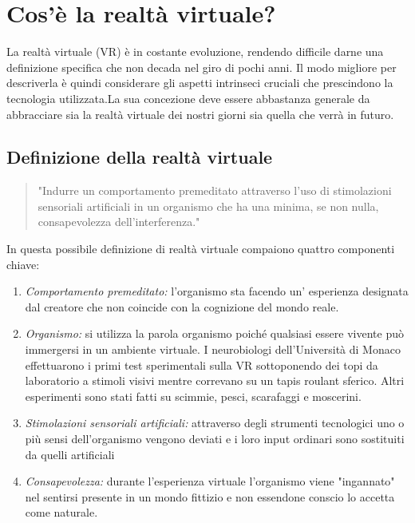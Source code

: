 \section{Cos'è la realtà virtuale?}

La realtà virtuale (VR) è in costante evoluzione, rendendo difficile darne una definizione specifica che non decada nel giro di pochi anni. Il modo migliore per descriverla è quindi considerare gli aspetti intrinseci cruciali che prescindono la tecnologia utilizzata.La sua concezione deve essere abbastanza generale da abbracciare sia la realtà virtuale dei nostri giorni sia quella che verrà in futuro.
\subsection{Definizione della realtà virtuale}

\begin{quotation}"Indurre un comportamento premeditato attraverso l'uso di stimolazioni sensoriali artificiali in un organismo che ha una minima, se non nulla, consapevolezza dell'interferenza."\cite{VRbook}
\end{quotation}	
In questa possibile definizione di realtà virtuale compaiono quattro componenti chiave:

\begin{enumerate}
	\item \textit{Comportamento premeditato:} l'organismo sta facendo un' esperienza designata dal creatore
	che non coincide con la cognizione del mondo reale.
	\item \textit{Organismo:} si utilizza la parola organismo poiché qualsiasi essere vivente può immergersi in un ambiente virtuale. I neurobiologi dell'Università di Monaco effettuarono i primi test sperimentali sulla VR sottoponendo dei topi da laboratorio a stimoli visivi mentre correvano su un tapis roulant sferico. Altri esperimenti sono stati fatti su scimmie, pesci, scarafaggi e moscerini.
	\item \textit{Stimolazioni sensoriali artificiali:} attraverso degli strumenti tecnologici uno o più sensi dell'organismo vengono deviati e i loro input ordinari sono sostituiti da quelli artificiali
	\item \textit{Consapevolezza:} durante l'esperienza virtuale l'organismo viene "ingannato" nel sentirsi presente in un mondo fittizio e non essendone conscio lo accetta come naturale.
\end{enumerate}

